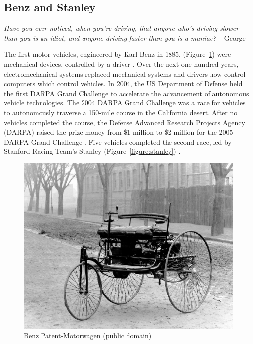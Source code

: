 \documentclass{article}
\begin{document}
\subsection{Benz and Stanley}

\begin{mdframed}
    \emph{Have you ever noticed, when you're driving, that anyone who's driving slower than you is an idiot, and anyone driving faster than you is a maniac?} -- George \cite{carlin_carlin_1984}
\end{mdframed}

\noindent The first motor vehicles, engineered by Karl Benz in 1885, (Figure~\ref{figure:benz}) were mechanical devices, controlled by a driver \citep{benz__co._in_mannheim_fahrzeug_1886}. Over the next one-hundred years, electromechanical systems replaced mechanical systems and drivers now control computers which control vehicles. In 2004, the US Department of Defense held the first DARPA Grand Challenge to accelerate the advancement of autonomous vehicle technologies. The 2004 DARPA Grand Challenge was a race for vehicles to autonomously traverse a 150-mile course in the California desert. After no vehicles completed the course, the Defense Advanced Research Projects Agency (DARPA) raised the prize money from \$1 million to \$2 million for the 2005 DARPA Grand Challenge \citep{defense_advanced_research_projects_agency_darpa_2004}. Five vehicles completed the second race, led by Stanford Racing Team's Stanley (Figure~\ref{figure:stanley}) \citep{davis_say_2006, thrun_stanley_2007}.

\begin{figure}[h] \centering
    \includegraphics[width=\textwidth]{images/1885Benz.jpg}
    \caption{Benz Patent-Motorwagen (public domain)}
    \label{figure:benz}
\end{figure}
\end{document}
